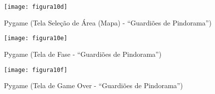                                
                                                                \begin{figure}[!h]
                                                                    \centering
                                                                    \caption{ Pygame (Tela Seleção de Área (Mapa) - “Guardiões de Pindorama”)   }%
                                                                    \label{fig:figura10d}
                                                                    \texttt{[image: figura10d]}
                                                                    \end{figure}
                                
                                                                    \begin{figure}[!h]
                                                                        \centering
                                                                        \caption{ Pygame (Tela de Fase - “Guardiões de Pindorama”)  }%
                                                                        \label{fig:figura10e}
                                                                        \texttt{[image: figura10e]}
                                                                        \end{figure}
                                 
                                                                        \begin{figure}[!h]
                                                                            \centering
                                                                            \caption{  Pygame (Tela de Game Over - “Guardiões de Pindorama”)  }%
                                                                            \label{fig:figura10f}
                                                                            \texttt{[image: figura10f]}
                                                                            \end{figure}
 
                                                                            \clearpage                                                                          